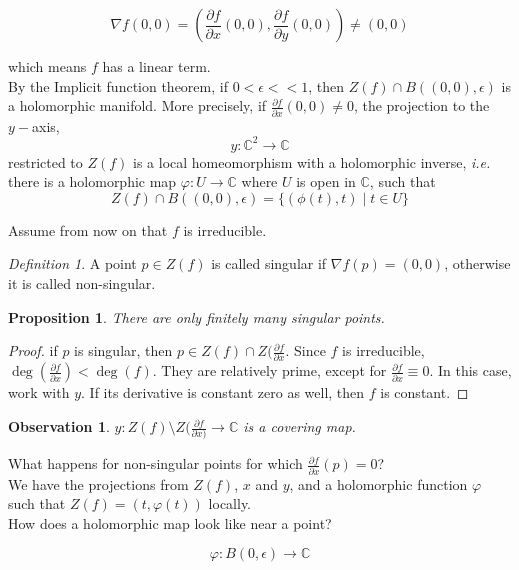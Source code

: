 \documentclass[12pt]{article}
\newtheorem{proposition}[theorem]{Proposition}
\newtheorem{observation}[theorem]{Observation}
\theoremstyle{remark}
\newtheorem{definition}[theorem]{Definition}
\newcommand{\ie}{\emph{i.e.} }
\newcommand{\C}{\mathbb{C}}
\begin{document}
$$\nabla f(0,0) = (\frac{\partial f}{\partial x}(0,0), \frac{\partial f}{\partial y}(0,0)) \neq (0,0) $$

which means $f$ has a linear term.\\

By the Implicit function theorem, if $0 < \epsilon << 1$, then $Z(f) \cap B((0,0), \epsilon)$ is a holomorphic manifold. More precisely, if $\frac{\partial f}{\partial x}(0,0) \neq 0$, 
the projection to the $y-$axis, $$y: \C^2 \rightarrow \C$$
restricted to $Z(f)$ is a local homeomorphism with a holomorphic inverse, \ie there is a holomorphic map $\varphi : U \rightarrow \C$ where $U$ is open in $\C$, such that 
$$ Z(f) \cap B((0,0), \epsilon) = \{(\phi(t), t) \; | \; t \in U  \} $$

Assume from now on that $f$ is irreducible.

\begin{definition}
A point $p \in Z(f)$ is called singular if $\nabla f(p) = (0,0)$, otherwise it is called non-singular.
\end{definition}

\begin{proposition}
There are only finitely many singular points.
\end{proposition}

\begin{proof}
if $p$ is singular, then $p \in Z(f) \cap Z(\frac{\partial f}{\partial x}$. Since $f$ is irreducible, $\deg (\frac{\partial f}{\partial x}) < \deg(f)$. They are relatively prime, except for $\frac{\partial f}{\partial x} \equiv 0$. In this case, work with $y$. If its derivative is constant zero as well, then $f$ is constant.
\end{proof}

\begin{observation}
 $y: Z(f) \setminus Z(\frac{\partial f}{\partial x)} \rightarrow \C$ is a covering map. 
\end{observation}

What happens for non-singular points for which $\frac{\partial f}{\partial x}(p) = 0$? \\

We have the projections from $Z(f)$, $x$ and $y$, and a holomorphic function $\varphi$ such that $Z(f) = (t, \varphi(t))$ locally.\\ 

How does a holomorphic map look like near a point? 

$$\varphi: B(0, \epsilon)  \rightarrow \C  $$
\end{document}
